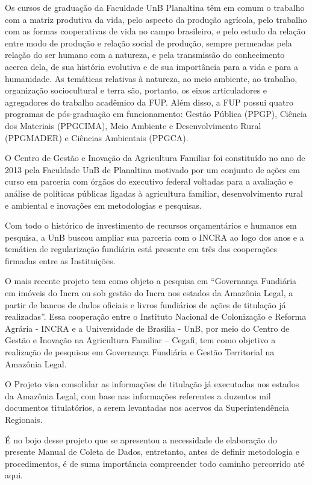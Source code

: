 \documentclass[
  letterpaper,
]{report}
\begin{document}
Os cursos de graduação da Faculdade UnB Planaltina têm em comum o
trabalho com a matriz produtiva da vida, pelo aspecto da produção
agrícola, pelo trabalho com as formas cooperativas de vida no campo
brasileiro, e pelo estudo da relação entre modo de produção e relação
social de produção, sempre permeadas pela relação do ser humano com a
natureza, e pela transmissão do conhecimento acerca dela, de sua
história evolutiva e de sua importância para a vida e para a humanidade.
As temáticas relativas à natureza, ao meio ambiente, ao trabalho,
organização sociocultural e terra são, portanto, os eixos articuladores
e agregadores do trabalho acadêmico da FUP. Além disso, a FUP possui
quatro programas de pós-graduação em funcionamento: Gestão Pública
(PPGP), Ciência dos Materiais (PPGCIMA), Meio Ambiente e Desenvolvimento
Rural (PPGMADER) e Ciências Ambientais (PPGCA).~

O Centro de Gestão e Inovação da Agricultura Familiar foi constituído no
ano de 2013 pela Faculdade UnB de Planaltina motivado por um conjunto de
ações em curso em parceria com órgãos do executivo federal voltadas para
a avaliação e análise de políticas públicas ligadas à agricultura
familiar, desenvolvimento rural e ambiental e inovações em metodologias
e pesquisas.~

Com todo o histórico de investimento de recursos orçamentários e humanos
em pesquisa, a UnB buscou ampliar sua parceria com o INCRA ao logo dos
anos e a temática de regularização fundiária está presente em três das
cooperações firmadas entre as Instituições.

O mais recente projeto tem como objeto a pesquisa em ``Governança
Fundiária em imóveis do Incra ou sob gestão do Incra nos estados da
Amazônia Legal, a partir de bancos de dados oficiais e livros fundiários
de ações de titulação já realizadas''. Essa cooperação entre o Instituto
Nacional de Colonização e Reforma Agrária - INCRA e a Universidade de
Brasília - UnB, por meio do Centro de Gestão e Inovação na Agricultura
Familiar -- Cegafi, tem como objetivo a realização de pesquisas em
Governança Fundiária e Gestão Territorial na Amazônia Legal.

O Projeto visa consolidar as informações de titulação já executadas nos
estados da Amazônia Legal, com base nas informações referentes a
duzentos mil documentos titulatórios, a serem levantadas nos acervos da
Superintendência Regionais.

É no bojo desse projeto que se apresentou a necessidade de elaboração do
presente Manual de Coleta de Dados, entretanto, antes de definir
metodologia e procedimentos, é de suma importância compreender todo
caminho percorrido até aqui.
\end{document}
